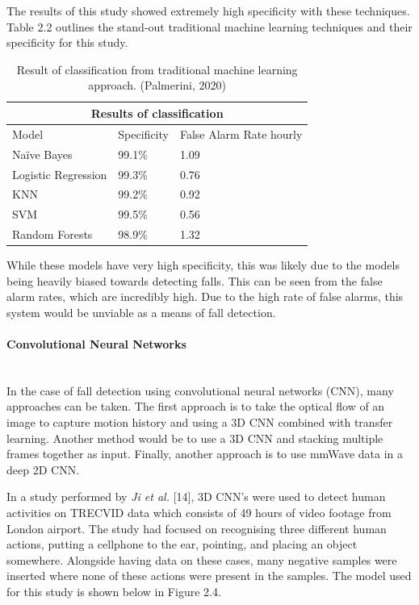 The results of this study showed extremely high specificity with these techniques. Table 2.2 outlines the stand-out traditional machine learning techniques and their specificity for this study. 

\begin{table}[H]
    \centering
    \begin{tabular}{ |p{3.5cm}|p{3cm}|p{4.3cm}|}
     \hline
     \multicolumn{3}{|c|}{Results of classification} \\
     \hline
     Model &Specificity & False Alarm Rate hourly\\
     \hline
     Naïve Bayes&99.1\%&1.09\\
     Logistic Regression&99.3\%&0.76\\
     KNN&99.2\%&0.92\\
     SVM&99.5\%&0.56\\
     Random Forests&98.9\%&1.32\\
     \hline
    \end{tabular}
    \caption{Result of classification from traditional machine learning approach. (Palmerini, 2020)}
\end{table}

While these models have very high specificity, this was likely due to the models being heavily biased towards detecting falls. This can be seen from the false alarm rates, which are incredibly high. Due to the high rate of false alarms, this system would be unviable as a means of fall detection.
\paragraph{Convolutional Neural Networks}\mbox{}\\

In the case of fall detection using convolutional neural networks (CNN), many approaches can be taken. The first approach is to take the optical flow of an image to capture motion history and using a 3D CNN combined with transfer learning. Another method would be to use a 3D CNN and stacking multiple frames together as input. Finally, another approach is to use mmWave data in a deep 2D CNN. 

In a study performed by \textit{Ji et al.} [14], 3D CNN's were used to detect human activities on TRECVID data which consists of 49 hours of video footage from London airport. The study had focused on recognising three different human actions, putting a cellphone to the ear, pointing, and placing an object somewhere. Alongside having data on these cases, many negative samples were inserted where none of these actions were present in the samples. The model used for this study is shown below in Figure 2.4. 

